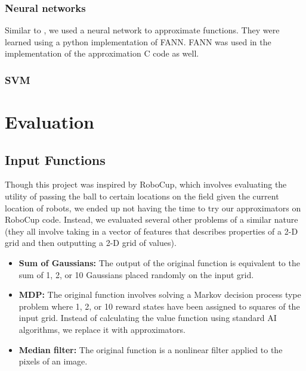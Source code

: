 \documentclass{article}
\begin{document}
\subsubsection{Neural networks}

Similar to \cite{Esmaeilzadeh12}, we used a neural network to approximate functions. They were learned using a python implementation of FANN. FANN was used in the implementation of the approximation C code as well. %

\subsubsection{SVM}


\section{Evaluation}

\subsection{Input Functions}

Though this project was inspired by RoboCup, which involves evaluating the utility of passing the ball to certain locations on the field given the current location of robots, we ended up not having the time to try our approximators on RoboCup code. Instead, we evaluated several other problems of a similar nature (they all involve taking in a vector of features that describes properties of a 2-D grid and then outputting a 2-D grid of values).

\begin{itemize}
\item \textbf{Sum of Gaussians:} The output of the original function is equivalent to the sum of 1, 2, or 10 Gaussians placed randomly on the input grid.

\item \textbf{MDP:} The original function involves solving a Markov decision process type problem where 1, 2, or 10 reward states have been assigned to squares of the input grid. Instead of calculating the value function using standard AI algorithms, we replace it with approximators.

\item \textbf{Median filter:} The original function is a nonlinear filter applied to the pixels of an image.
\end{itemize}
\end{document}
